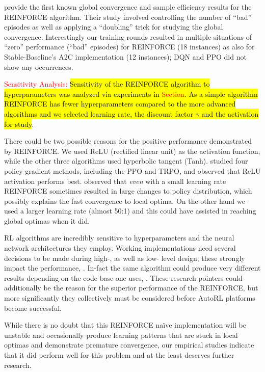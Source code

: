 \documentclass[referee, sn-mathphys-num]{sn-jnl}
\newcommand{\hlc}[2][cyan!17]{{\colorlet{foo}{#1} \sethlcolor{foo}\hl{#2}}}
\begin{document}
	\cite{zhang2021sample} provide the first known global convergence and sample efficiency results for the REINFORCE algorithm. Their study involved controlling the number of ``bad'' episodes as well as applying a ``doubling'' trick for studying the global convergence. Interestingly our training rounds resulted in multiple situations of ``zero'' performance (``bad'' episodes) for REINFORCE (18 instances) as also for Stable-Baseline's A2C implementation (12 instances); DQN and PPO did not show any occurrences.
	
	\textcolor{red}{Sensitivity Analysis:}
	\hlc{Sensitivity of the REINFORCE algorithm to hyperparameters was analyzed via experiments in {\textcolor{red}{Section}}. As a simple algorithm REINFORCE has fewer hyperparameters compared to the more advanced algorithms and we selected learning rate, the discount factor $\gamma$ and the activation for study}. 
	
	There could be two possible reasons for the positive performance demonstrated by REINFORCE. We used ReLU (rectified linear unit) as the activation function, while the other three algorithms used hyperbolic tangent (Tanh). \cite{henderson2018deep} studied four policy-gradient methods, including the PPO and TRPO, and observed that ReLU activation performs best. \cite{duan2016benchmarking} observed that \textit{even} with a small learning rate REINFORCE sometimes resulted in large changes to policy distribution, which possibly explains the fast convergence to local optima. On the other hand we used a larger learning rate (almost 50:1) and this could have assisted in reaching global optimas when it did.
	
	RL algorithms are incredibly sensitive to hyperparameters and the neural network architectures they employ. Working implementations need several decisions to be made during high-, as well as low- level design; these strongly impact the performance, \cite{henderson2018deep, andrychowicz2021matters}. In-fact the same algorithm could produce very different results depending on the code base one uses, \cite{henderson2018deep, SB3-paper}. These research pointers could additionally be the reason for the superior performance of the REINFORCE, but more significantly they collectively must be considered before AutoRL platforms become successful.
	
	While there is no doubt that this REINFORCE na\"ive implementation will be unstable and occasionally produce learning patterns that are stuck in local optimas and demonstrate premature convergence, our empirical studies indicate that it did perform well for this problem and at the least deserves further research.
	
\end{document}
